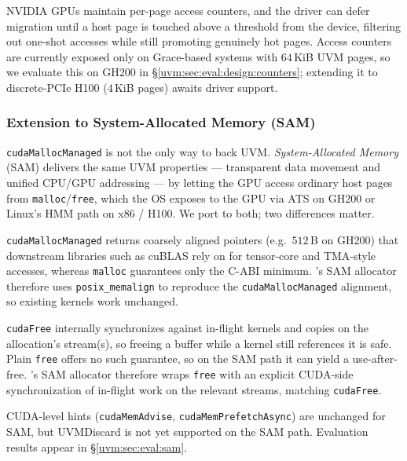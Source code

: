 NVIDIA GPUs maintain per-page access counters, and the driver can defer migration
    until a host page is touched above a threshold from the device,
    filtering out one-shot accesses while still promoting genuinely hot pages.
Access counters are currently exposed only on Grace-based systems with $64$\,KiB UVM pages,
    so we evaluate this on GH200 in \S\ref{uvm:sec:eval:design:counters};
    extending it to discrete-PCIe H100 ($4$\,KiB pages) awaits driver support.

\subsubsection{Extension to System-Allocated Memory (SAM)}
\label{uvm:sec:design:sam}
\texttt{cudaMallocManaged} is not the only way to back UVM.
\emph{System-Allocated Memory} (SAM) delivers the same UVM properties
    --- transparent data movement and unified CPU/GPU addressing ---
    by letting the GPU access ordinary host pages from \texttt{malloc}/\texttt{free},
    which the OS exposes to the GPU via ATS on GH200 or Linux's HMM path on x86 / H100.
We port {\uvmname} to both; two differences matter.

\texttt{cudaMallocManaged} returns coarsely aligned pointers (e.g.\ $512$\,B on GH200)
    that downstream libraries such as cuBLAS rely on for tensor-core and TMA-style accesses,
    whereas \texttt{malloc} guarantees only the C-ABI minimum.
{\uvmname}'s SAM allocator therefore uses \texttt{posix\_memalign}
    to reproduce the \texttt{cudaMallocManaged} alignment, so existing kernels work unchanged.

\texttt{cudaFree} internally synchronizes against in-flight kernels and copies on the allocation's stream(s),
    so freeing a buffer while a kernel still references it is safe.
Plain \texttt{free} offers no such guarantee, so on the SAM path it can yield a use-after-free.
{\uvmname}'s SAM allocator therefore wraps \texttt{free} with an explicit
    CUDA-side synchronization of in-flight work on the relevant streams, matching \texttt{cudaFree}.

CUDA-level hints (\texttt{cudaMemAdvise}, \texttt{cudaMemPrefetchAsync}) are unchanged for SAM,
    but UVMDiscard is not yet supported on the SAM path.
Evaluation results appear in \S\ref{uvm:sec:eval:sam}.


